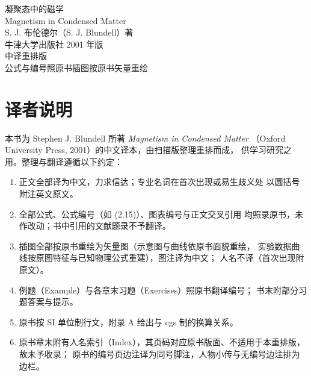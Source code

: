 \documentclass[11pt,a4paper,twoside,openright]{ctexbook}
\renewcommand{\chaptermark}[1]{\markboth{第\arabic{chapter}章\quad #1}{}}
\begin{document}
\begin{titlepage}
\thispagestyle{empty}
\centering
\vspace*{3.2cm}
{\heiti 凝聚态中的磁学}\\[1.2em]
{\kaishu Magnetism in Condensed Matter}\\[3.5em]
{S. J. 布伦德尔（S. J. Blundell）\quad 著}\\[1.0em]
{\kaishu 牛津大学出版社 2001 年版}\\[2.5em]
{\kaishu 中译重排版}\\[1em]
{\kaishu 公式与编号照原书\quad 插图按原书矢量重绘}
\vfill
\end{titlepage}

\thispagestyle{empty}\mbox{}\clearpage

\frontmatter
\chapter*{译者说明}
本书为 Stephen J. Blundell 所著 \emph{Magnetism in Condensed Matter}
（Oxford University Press, 2001）的中文译本，由扫描版整理重排而成，
供学习研究之用。整理与翻译遵循以下约定：
\begin{enumerate}[itemsep=0.2em]
  \item 正文全部译为中文，力求信达；专业名词在首次出现或易生歧义处
        以圆括号附注英文原文。
  \item 全部公式、公式编号（如 (2.15)）、图表编号与正文交叉引用
        均照录原书，未作改动；书中引用的文献题录不予翻译。
  \item 插图全部按原书重绘为矢量图（示意图与曲线依原书面貌重绘，
        实验数据曲线按原图特征与已知物理公式重建），图注译为中文；
        人名不译（首次出现附原文）。
  \item 例题（Example）与各章末习题（Exercises）照原书翻译编号；
        书末附部分习题答案与提示。
  \item 原书按 SI 单位制行文，附录 A 给出与 cgs 制的换算关系。
  \item 原书章末附有人名索引（Index），其页码对应原书版面、不适用于本重排版，故未予收录；
        原书的编号页边注译为同号脚注，人物小传与无编号边注排为边栏。
\end{enumerate}



\tableofcontents

\mainmatter










\appendix
{}
\renewcommand{\chaptermark}[1]{\markboth{附录\Alph{chapter}\quad #1}{}}







\end{document}
